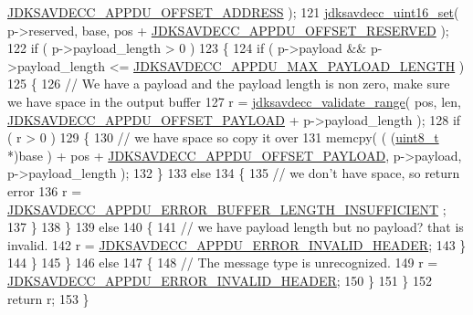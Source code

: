 \begin{DoxyCode}
      \hyperlink{group__appdu__offset_ga15be7a53e331d7d83a0e1909abae7ae2}{JDKSAVDECC\_APPDU\_OFFSET\_ADDRESS} );
121             \hyperlink{group__endian_ga14b9eeadc05f94334096c127c955a60b}{jdksavdecc\_uint16\_set}( p->reserved, base, pos + 
      \hyperlink{group__appdu__offset_ga3bfdd1153365a6b7a1b8849f382a950c}{JDKSAVDECC\_APPDU\_OFFSET\_RESERVED} );
122             \textcolor{keywordflow}{if} ( p->payload\_length > 0 )
123             \{
124                 \textcolor{keywordflow}{if} ( p->payload && p->payload\_length <= 
      \hyperlink{group__appdu__constants_gad8ac9f39ba96a6faf9e4d69b1530272f}{JDKSAVDECC\_APPDU\_MAX\_PAYLOAD\_LENGTH} )
125                 \{
126                     \textcolor{comment}{// We have a payload and the payload length is non zero, make sure we have space in the
       output buffer}
127                     r = \hyperlink{group__util_ga9c02bdfe76c69163647c3196db7a73a1}{jdksavdecc\_validate\_range}( pos, len, 
      \hyperlink{group__appdu__offset_ga8ac1754da7222c1b936a70a384b3a89d}{JDKSAVDECC\_APPDU\_OFFSET\_PAYLOAD} + p->payload\_length );
128                     \textcolor{keywordflow}{if} ( r > 0 )
129                     \{
130                         \textcolor{comment}{// we have space so copy it over}
131                         memcpy( ( (\hyperlink{stdint_8h_aba7bc1797add20fe3efdf37ced1182c5}{uint8\_t} *)base ) + pos + 
      \hyperlink{group__appdu__offset_ga8ac1754da7222c1b936a70a384b3a89d}{JDKSAVDECC\_APPDU\_OFFSET\_PAYLOAD}, p->payload, p->payload\_length );
132                     \}
133                     \textcolor{keywordflow}{else}
134                     \{
135                         \textcolor{comment}{// we don't have space, so return error}
136                         r = \hyperlink{group__appdu__errors_gac3f69cd1306f26882c58d008eb975e0f}{JDKSAVDECC\_APPDU\_ERROR\_BUFFER\_LENGTH\_INSUFFICIENT}
      ;
137                     \}
138                 \}
139                 \textcolor{keywordflow}{else}
140                 \{
141                     \textcolor{comment}{// we have payload length but no payload? that is invalid.}
142                     r = \hyperlink{group__appdu__errors_gab87365f108c8b06ef41b56adaf53ec2d}{JDKSAVDECC\_APPDU\_ERROR\_INVALID\_HEADER};
143                 \}
144             \}
145         \}
146         \textcolor{keywordflow}{else}
147         \{
148             \textcolor{comment}{// The message type is unrecognized.}
149             r = \hyperlink{group__appdu__errors_gab87365f108c8b06ef41b56adaf53ec2d}{JDKSAVDECC\_APPDU\_ERROR\_INVALID\_HEADER};
150         \}
151     \}
152     \textcolor{keywordflow}{return} r;
153 \}
\end{DoxyCode}


